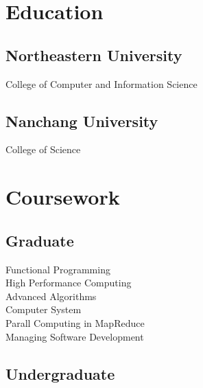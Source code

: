 \documentclass[a4paper]{lyu-resume} %
\begin{document}
\begin{minipage}[t]{0.33\textwidth}

\section{Education} 

\subsection{Northeastern University}

College of Computer and Information Science

\sectionspace %


\subsection{Nanchang University}

College of Science

\sectionspace %


\section{Coursework}

\subsection{Graduate}

Functional Programming \\
High Performance Computing\\
Advanced Algorithms \\
Computer System \\
Parall Computing in MapReduce \\
Managing Software Development

\sectionspace %


\subsection{Undergraduate}


\end{minipage}
\end{document}
